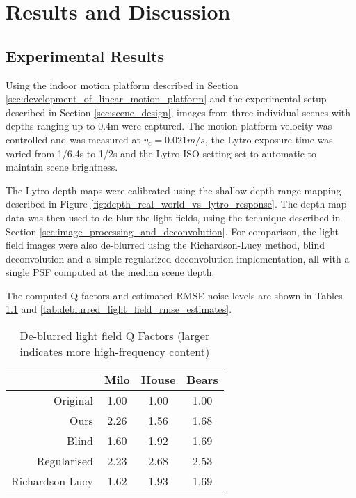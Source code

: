 
\chapter{Results and Discussion}
\label{chap:results_and_discussion}

\section{Experimental Results}
\label{sec:experimental_results}

Using the indoor motion platform described in Section \ref{sec:development_of_linear_motion_platform} and the experimental setup described in Section \ref{sec:scene_design}, images from three individual scenes with depths ranging up to \nicetilde0.4m were captured.
The motion platform velocity was controlled and was measured at $v_c = 0.021m/s$, the Lytro exposure time was varied from 1/6.4s to 1/2s and the Lytro ISO setting set to automatic to maintain scene brightness.

The Lytro depth maps were calibrated using the shallow depth range mapping described in Figure \ref{fig:depth_real_world_vs_lytro_response}.
The depth map data was then used to de-blur the light fields, using the technique described in Section \ref{sec:image_processing_and_deconvolution}.
For comparison, the light field images were also de-blurred using the Richardson-Lucy method, blind deconvolution and a simple regularized deconvolution implementation, all with a single PSF computed at the median scene depth.

The computed Q-factors and estimated RMSE noise levels are shown in Tables \ref{tab:deblurred_light_field_q_factors} and \ref{tab:deblurred_light_field_rmse_estimates}.


\begin{table}[h]
\centering
\caption[De-blurred light field Q Factors]{De-blurred light field Q Factors (larger indicates more high-frequency content)}
\label{tab:deblurred_light_field_q_factors}
\begin{tabular}[h]{r | c c c}
                & Milo & House & Bears \\
\hline
Original        & 1.00 & 1.00  & 1.00 \\
Ours            & 2.26 & 1.56  & 1.68 \\
Blind           & 1.60 & 1.92  & 1.69 \\
Regularised     & 2.23 & 2.68  & 2.53 \\
Richardson-Lucy & 1.62 & 1.93  & 1.69 \\
\end{tabular}
\end{table}


